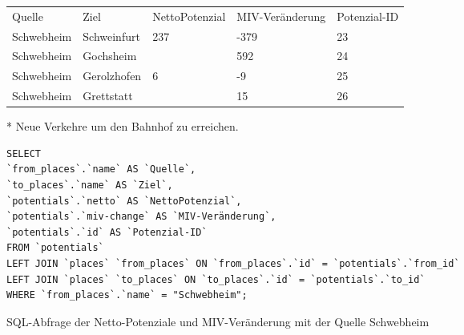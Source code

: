 \begin{tabularx}{\textwidth}{*5{X}}
Quelle & Ziel & NettoPotenzial & MIV-Veränderung & Potenzial-ID\\ 
Schwebheim & Schweinfurt & 237 & -379 & 23\\ 
Schwebheim & Gochsheim &  & 592 & 24\\ 
Schwebheim & Gerolzhofen & 6 & -9 & 25\\ 
Schwebheim & Grettstatt &  & 15 & 26\\ 
\end{tabularx}     
\newline
\newline
* Neue Verkehre um den Bahnhof zu erreichen.
\newline
\begin{listing}[htbp]
\begin{verbatim}
SELECT
`from_places`.`name` AS `Quelle`, 
`to_places`.`name` AS `Ziel`, 
`potentials`.`netto` AS `NettoPotenzial`, 
`potentials`.`miv-change` AS `MIV-Veränderung`, 
`potentials`.`id` AS `Potenzial-ID`
FROM `potentials`
LEFT JOIN `places` `from_places` ON `from_places`.`id` = `potentials`.`from_id`
LEFT JOIN `places` `to_places` ON `to_places`.`id` = `potentials`.`to_id`
WHERE `from_places`.`name` = "Schwebheim";
\end{verbatim}
\caption{SQL-Abfrage der Netto-Potenziale und MIV-Veränderung mit der Quelle Schwebheim}\label{lst-fz-schwebheim}
\end{listing}